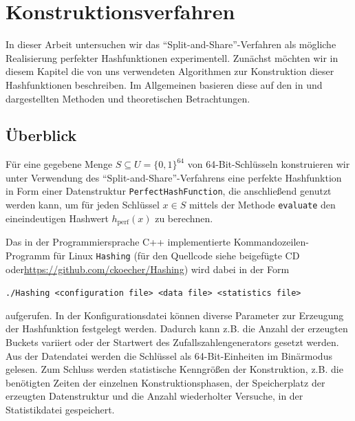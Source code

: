 \documentclass[a4paper,12pt,twoside]{report}
\begin{document}

 
\tableofcontents
\newpage
{}

\newcommand{\size}[1]{\ensuremath{\operatorname{size}_{\operatorname{#1}}}}

\chapter{Konstruktionsverfahren}
\label{cha:konstruktion}

In dieser Arbeit untersuchen wir das ``Split-and-Share''-Verfahren als mögliche Realisierung perfekter Hashfunktionen experimentell. Zunächst möchten wir in diesem Kapitel die von uns verwendeten Algorithmen zur Konstruktion dieser Hashfunktionen beschreiben.
Im Allgemeinen basieren diese auf den in \cite{Dietzfelbinger2007} und \cite{Botelho2013108} dargestellten Methoden und theoretischen Betrachtungen.

\section{Überblick}
\label{sec:ueberblick}

Für eine gegebene Menge $S\subseteq U=\{0, 1\}^{64}$ von 64-Bit-Schlüsseln konstruieren wir unter Verwendung des ``Split-and-Share''-Verfahrens eine perfekte Hashfunktion in Form einer Datenstruktur \texttt{PerfectHashFunction}, die anschließend genutzt werden kann, um für jeden Schlüssel $x\in S$ mittels der Methode \texttt{evaluate} den eineindeutigen Hashwert $h_{\text{perf}}(x)$ zu berechnen.

Das in der Programmiersprache C++ implementierte Kommandozeilen-Pro\-gramm für Linux \texttt{Hashing} (für den Quellcode siehe beigefügte CD oder\linebreak \url{https://github.com/ckoecher/Hashing}) wird dabei in der Form
\begin{center}
 \texttt{./Hashing <configuration file> <data file> <statistics file>}
\end{center}
aufgerufen.
In der Konfigurationsdatei können diverse Parameter zur Erzeugung der Hashfunktion festgelegt werden.
Dadurch kann z.B. die Anzahl der erzeugten Buckets variiert oder der Startwert des Zufallszahlengenerators gesetzt werden.
Aus der Datendatei werden die Schlüssel als 64-Bit-Einheiten im Binärmodus gelesen.
Zum Schluss werden statistische Kenngrößen der Konstruktion, z.B. die benötigten Zeiten der einzelnen Konstruktionsphasen, der Speicherplatz der erzeugten Datenstruktur und die Anzahl wiederholter Versuche, in der Statistikdatei gespeichert.
\end{document}
